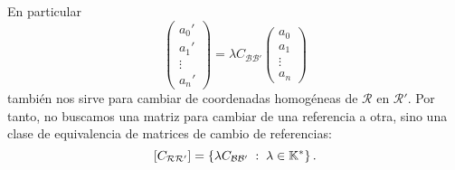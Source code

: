 En particular
\[ \begin{pmatrix} a_{0}' \\ a_{1}' \\ \vdots \\ a_{n}' \end{pmatrix} =\lambda C_{\mathcal{B}\mathcal{B}'}\begin{pmatrix} a_{0} \\ a_{1} \\ \vdots \\ a_{n} \end{pmatrix}\]
también nos sirve para cambiar de coordenadas homogéneas de $\displaystyle \mathcal{R} $ en $\displaystyle \mathcal{R}' $. Por tanto, no buscamos una matriz para cambiar de una referencia a otra, sino una clase de equivalencia de matrices de cambio de referencias:
\[ [C_{\mathcal{R}\mathcal{R}'}] = \left\{ \lambda C_{\mathcal{B}\mathcal{B}'} \; : \; \lambda \in \mathbb{K}^{*}\right\}  .\]
